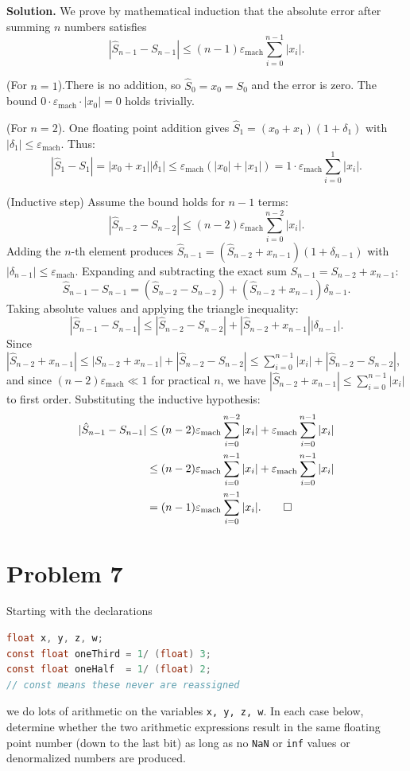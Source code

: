 \documentclass[letterpaper, 11pt]{article}
\newcommand{\1}{\mathds{1}}	%
\theoremstyle{definition}
\begin{document}
\medskip
\textbf{Solution.} We prove by mathematical induction that the absolute error after summing $n$ numbers satisfies
\[
|\hat{S}_{n-1} - S_{n-1}| \leq (n-1)\varepsilon_{\mathrm{mach}} \sum_{i=0}^{n-1}|x_i|.
\]

(For $n = 1$).There is no addition, so $\hat{S}_0 = x_0 = S_0$ and the error is zero. The bound $0 \cdot \varepsilon_{\mathrm{mach}} \cdot |x_0| = 0$ holds trivially.

(For $n = 2$). One floating point addition gives $\hat{S}_1 = (x_0 + x_1)(1 + \delta_1)$ with $|\delta_1| \leq \varepsilon_{\mathrm{mach}}$. Thus:
\[
|\hat{S}_1 - S_1| = |x_0 + x_1||\delta_1| \leq \varepsilon_{\mathrm{mach}}(|x_0| + |x_1|) = 1 \cdot \varepsilon_{\mathrm{mach}} \sum_{i=0}^{1}|x_i|.
\]

(Inductive step) Assume the bound holds for $n - 1$ terms:
\[
|\hat{S}_{n-2} - S_{n-2}| \leq (n-2)\varepsilon_{\mathrm{mach}} \sum_{i=0}^{n-2}|x_i|.
\]
Adding the $n$-th element produces $\hat{S}_{n-1} = (\hat{S}_{n-2} + x_{n-1})(1 + \delta_{n-1})$ with $|\delta_{n-1}| \leq \varepsilon_{\mathrm{mach}}$. Expanding and subtracting the exact sum $S_{n-1} = S_{n-2} + x_{n-1}$:
\[
\hat{S}_{n-1} - S_{n-1} = (\hat{S}_{n-2} - S_{n-2}) + (\hat{S}_{n-2} + x_{n-1})\delta_{n-1}.
\]
Taking absolute values and applying the triangle inequality:
\[
|\hat{S}_{n-1} - S_{n-1}| \leq |\hat{S}_{n-2} - S_{n-2}| + |\hat{S}_{n-2} + x_{n-1}||\delta_{n-1}|.
\]
Since $|\hat{S}_{n-2} + x_{n-1}| \leq |S_{n-2} + x_{n-1}| + |\hat{S}_{n-2} - S_{n-2}| \leq \sum_{i=0}^{n-1}|x_i| + |\hat{S}_{n-2} - S_{n-2}|$, and since $(n-2)\varepsilon_{\mathrm{mach}} \ll 1$ for practical $n$, we have $|\hat{S}_{n-2} + x_{n-1}| \leq \sum_{i=0}^{n-1}|x_i|$ to first order. Substituting the inductive hypothesis:
\begin{align*}
|\hat{S}_{n-1} - S_{n-1}| &\leq (n-2)\varepsilon_{\mathrm{mach}} \sum_{i=0}^{n-2}|x_i| + \varepsilon_{\mathrm{mach}} \sum_{i=0}^{n-1}|x_i| \\
&\leq (n-2)\varepsilon_{\mathrm{mach}} \sum_{i=0}^{n-1}|x_i| + \varepsilon_{\mathrm{mach}} \sum_{i=0}^{n-1}|x_i| \\
&= (n-1)\varepsilon_{\mathrm{mach}} \sum_{i=0}^{n-1}|x_i|. \qed
\end{align*}
\section*{Problem 7}

Starting with the declarations
\begin{lstlisting}[language=C, numbers=none]
float x, y, z, w;
const float oneThird = 1/ (float) 3;
const float oneHalf  = 1/ (float) 2;
// const means these never are reassigned
\end{lstlisting}
we do lots of arithmetic on the variables \texttt{x, y, z, w}. In each case below, determine whether the two arithmetic expressions result in the same floating point number (down to the last bit) as long as no \texttt{NaN} or \texttt{inf} values or denormalized numbers are produced.
\end{document}
